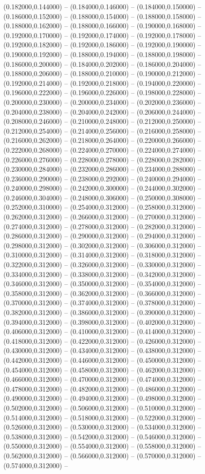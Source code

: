 (0.182000,0.144000) -- (0.184000,0.146000) -- (0.184000,0.150000) -- (0.186000,0.152000) -- (0.188000,0.154000) -- (0.188000,0.158000) -- (0.188000,0.162000) -- (0.188000,0.166000) -- (0.190000,0.168000) -- (0.192000,0.170000) -- (0.192000,0.174000) -- (0.192000,0.178000) -- (0.192000,0.182000) -- (0.192000,0.186000) -- (0.192000,0.190000) -- (0.190000,0.192000) -- (0.188000,0.194000) -- (0.188000,0.198000) -- (0.186000,0.200000) -- (0.184000,0.202000) -- (0.186000,0.204000) -- (0.188000,0.206000) -- (0.188000,0.210000) -- (0.190000,0.212000) -- (0.192000,0.214000) -- (0.192000,0.218000) -- (0.194000,0.220000) -- (0.196000,0.222000) -- (0.196000,0.226000) -- (0.198000,0.228000) -- (0.200000,0.230000) -- (0.200000,0.234000) -- (0.202000,0.236000) -- (0.204000,0.238000) -- (0.204000,0.242000) -- (0.206000,0.244000) -- (0.208000,0.246000) -- (0.210000,0.248000) -- (0.212000,0.250000) -- (0.212000,0.254000) -- (0.214000,0.256000) -- (0.216000,0.258000) -- (0.216000,0.262000) -- (0.218000,0.264000) -- (0.220000,0.266000) -- (0.222000,0.268000) -- (0.224000,0.270000) -- (0.224000,0.274000) -- (0.226000,0.276000) -- (0.228000,0.278000) -- (0.228000,0.282000) -- (0.230000,0.284000) -- (0.232000,0.286000) -- (0.234000,0.288000) -- (0.236000,0.290000) -- (0.238000,0.292000) -- (0.240000,0.294000) -- (0.240000,0.298000) -- (0.242000,0.300000) -- (0.244000,0.302000) -- (0.246000,0.304000) -- (0.248000,0.306000) -- (0.250000,0.308000) -- (0.252000,0.310000) -- (0.254000,0.312000) -- (0.258000,0.312000) -- (0.262000,0.312000) -- (0.266000,0.312000) -- (0.270000,0.312000) -- (0.274000,0.312000) -- (0.278000,0.312000) -- (0.282000,0.312000) -- (0.286000,0.312000) -- (0.290000,0.312000) -- (0.294000,0.312000) -- (0.298000,0.312000) -- (0.302000,0.312000) -- (0.306000,0.312000) -- (0.310000,0.312000) -- (0.314000,0.312000) -- (0.318000,0.312000) -- (0.322000,0.312000) -- (0.326000,0.312000) -- (0.330000,0.312000) -- (0.334000,0.312000) -- (0.338000,0.312000) -- (0.342000,0.312000) -- (0.346000,0.312000) -- (0.350000,0.312000) -- (0.354000,0.312000) -- (0.358000,0.312000) -- (0.362000,0.312000) -- (0.366000,0.312000) -- (0.370000,0.312000) -- (0.374000,0.312000) -- (0.378000,0.312000) -- (0.382000,0.312000) -- (0.386000,0.312000) -- (0.390000,0.312000) -- (0.394000,0.312000) -- (0.398000,0.312000) -- (0.402000,0.312000) -- (0.406000,0.312000) -- (0.410000,0.312000) -- (0.414000,0.312000) -- (0.418000,0.312000) -- (0.422000,0.312000) -- (0.426000,0.312000) -- (0.430000,0.312000) -- (0.434000,0.312000) -- (0.438000,0.312000) -- (0.442000,0.312000) -- (0.446000,0.312000) -- (0.450000,0.312000) -- (0.454000,0.312000) -- (0.458000,0.312000) -- (0.462000,0.312000) -- (0.466000,0.312000) -- (0.470000,0.312000) -- (0.474000,0.312000) -- (0.478000,0.312000) -- (0.482000,0.312000) -- (0.486000,0.312000) -- (0.490000,0.312000) -- (0.494000,0.312000) -- (0.498000,0.312000) -- (0.502000,0.312000) -- (0.506000,0.312000) -- (0.510000,0.312000) -- (0.514000,0.312000) -- (0.518000,0.312000) -- (0.522000,0.312000) -- (0.526000,0.312000) -- (0.530000,0.312000) -- (0.534000,0.312000) -- (0.538000,0.312000) -- (0.542000,0.312000) -- (0.546000,0.312000) -- (0.550000,0.312000) -- (0.554000,0.312000) -- (0.558000,0.312000) -- (0.562000,0.312000) -- (0.566000,0.312000) -- (0.570000,0.312000) -- (0.574000,0.312000) -- 